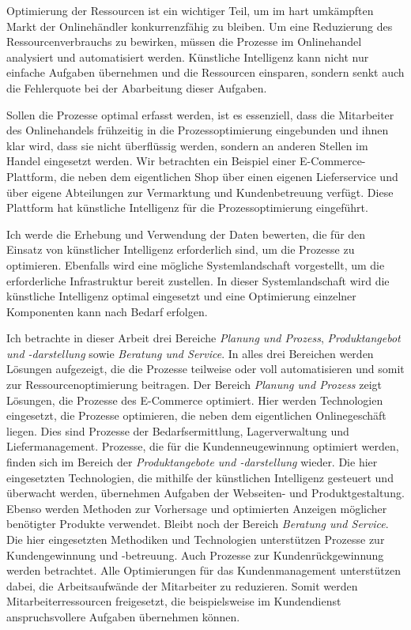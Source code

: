 Optimierung der Ressourcen ist ein wichtiger Teil, um im hart umkämpften Markt der Onlinehändler konkurrenzfähig zu bleiben. Um eine Reduzierung des Ressourcenverbrauchs zu bewirken, müssen die Prozesse im Onlinehandel analysiert und automatisiert werden. Künstliche Intelligenz kann nicht nur einfache Aufgaben übernehmen und die Ressourcen einsparen, sondern senkt auch die Fehlerquote bei der Abarbeitung dieser Aufgaben.\vspace{0.2cm}

Sollen die Prozesse optimal erfasst werden, ist es essenziell, dass die Mitarbeiter des Onlinehandels frühzeitig in die Prozessoptimierung eingebunden und ihnen klar wird, dass sie nicht überflüssig werden, sondern an anderen Stellen im Handel eingesetzt werden. Wir betrachten ein Beispiel einer E-Commerce-Plattform, die neben dem eigentlichen Shop über einen eigenen Lieferservice und über eigene Abteilungen zur Vermarktung und Kundenbetreuung verfügt. Diese Plattform hat künstliche Intelligenz für die Prozessoptimierung eingeführt.\vspace{0.2cm}

Ich werde die Erhebung und Verwendung der Daten bewerten, die für den Einsatz von künstlicher Intelligenz erforderlich sind, um die Prozesse zu optimieren. Ebenfalls wird eine mögliche Systemlandschaft vorgestellt, um die erforderliche Infrastruktur bereit zustellen. In dieser Systemlandschaft wird die künstliche Intelligenz optimal eingesetzt und eine Optimierung einzelner Komponenten kann nach Bedarf erfolgen.\vspace{0.2cm}

Ich betrachte in dieser Arbeit drei Bereiche \textit{Planung und Prozess}, \textit{Produktangebot und -darstellung} sowie \textit{Beratung und Service}. In alles drei Bereichen werden Lösungen aufgezeigt, die die Prozesse teilweise oder voll automatisieren und somit zur Ressourcenoptimierung beitragen. Der Bereich \textit{Planung und Prozess} zeigt Lösungen, die Prozesse des E-Commerce optimiert. Hier werden Technologien eingesetzt, die Prozesse optimieren, die neben dem eigentlichen Onlinegeschäft liegen. Dies sind Prozesse der Bedarfsermittlung, Lagerverwaltung und Liefermanagement. Prozesse, die für die Kundenneugewinnung optimiert werden, finden sich im Bereich der \textit{Produktangebote und -darstellung} wieder. Die hier eingesetzten Technologien, die mithilfe der künstlichen Intelligenz gesteuert und überwacht werden, übernehmen Aufgaben der Webseiten- und Produktgestaltung. Ebenso werden Methoden zur Vorhersage und optimierten Anzeigen möglicher benötigter Produkte verwendet. Bleibt noch der Bereich \textit{Beratung und Service}. Die hier eingesetzten Methodiken und Technologien unterstützen Prozesse zur Kundengewinnung und -betreuung. Auch Prozesse zur Kundenrückgewinnung werden betrachtet. Alle Optimierungen für das Kundenmanagement unterstützen dabei, die Arbeitsaufwände der Mitarbeiter zu reduzieren. Somit werden Mitarbeiterressourcen freigesetzt, die beispielsweise im Kundendienst anspruchsvollere Aufgaben übernehmen können.\vspace{0.2cm}


